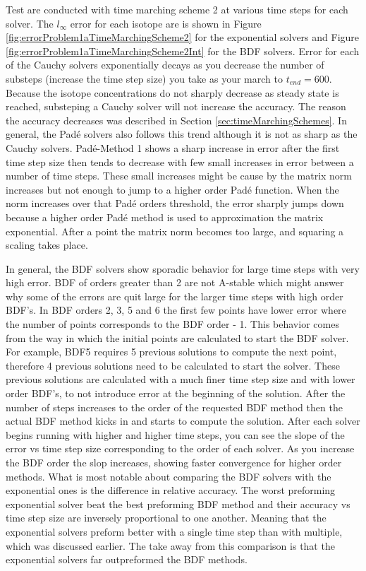 Test are conducted with time marching scheme 2 at various time steps for each solver. The $l_{\infty}$ error for each isotope are is shown in Figure \ref{fig:errorProblem1aTimeMarchingScheme2} for the exponential solvers and Figure \ref{fig:errorProblem1aTimeMarchingScheme2Int} for the BDF solvers. Error for each of the Cauchy solvers exponentially decays as you decrease the number of substeps (increase the time step size) you take as your march to $t_{end}=600$. Because the isotope concentrations do not sharply decrease as steady state is reached, substeping a Cauchy solver will not increase the accuracy. The reason the accuracy decreases was described in Section \ref{sec:timeMarchingSchemes}. In general, the Pad\'e solvers also follows this trend although it is not as sharp as the Cauchy solvers. Pad\'e-Method 1 shows a sharp increase in error after the first time step size then tends to decrease with few small increases in error between a number of time steps. These small increases might be cause by the matrix norm increases but not enough to jump to a higher order Pad\'e function. When the norm increases over that Pad\'e orders threshold, the error sharply jumps down because a higher order Pad\'e method is used to approximation the matrix exponential. After a point the matrix norm becomes too large, and squaring a scaling takes place. 

In general, the BDF solvers show sporadic behavior for large time steps with very high error. BDF of orders greater than 2 are not A-stable which might answer why some of the errors are quit large for the larger time steps with high order BDF's. In BDF orders 2, 3, 5 and 6 the first few points have lower error where the number of points corresponds to the BDF order - 1. This behavior comes from the way in which the initial points are calculated to start the BDF solver. For example, BDF5 requires 5 previous solutions to compute the next point, therefore 4 previous solutions need to be calculated to start the solver. These previous solutions are calculated with a much finer time step size and with lower order BDF's, to not introduce error at the beginning of the solution. After the number of steps increases to the order of the requested BDF method then the actual BDF method kicks in and starts to compute the solution. After each solver begins running with higher and higher time steps, you can see the slope of the error vs time step size corresponding to the order of each solver. As you increase the BDF order the slop increases, showing faster convergence for higher order methods. What is most notable about comparing the BDF solvers with the exponential ones is the difference in relative accuracy. The worst preforming exponential solver beat the best preforming BDF method and their accuracy vs time step size are inversely proportional to one another. Meaning that the exponential solvers preform better with a single time step than with multiple, which was discussed earlier. The take away from this comparison is that the exponential solvers far outpreformed the BDF methods. 

